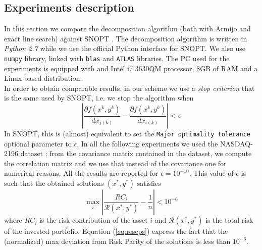 
\subsection{Experiments description}
In this section we compare the decomposition algorithm (both with Armijo and exact line search) against SNOPT \cite{snopt}.
The decomposition algorithm is written in \textit{Python 2.7} while we use the official Python interface for SNOPT. We also use \texttt{numpy} library, linked with \texttt{blas} and \texttt{ATLAS} libraries. The PC used for the experiments is equipped with and Intel i7 3630QM processor, 8GB of RAM and a Linux based distribution.\\
In order to obtain comparable results, in our scheme we use a \textit{stop criterion} that is the same used by SNOPT, i.e. we stop the algorithm when
\begin{equation}
\left| \frac{\partial f(x^k,y^k)}{d{x_{j(k)}}} - \frac{\partial f(x^k,y^k)}{d{x_{i(k)}} }\right| < \epsilon
\end{equation}
In SNOPT, this is (almost) equivalent to set the \texttt{Major optimality tolerance} optional parameter to $\epsilon$. 
In all the following experiments we used the NASDAQ-2196 dataset \cite{nasdaq}; from the covariance matrix contained in the dataset, we compute the correlation matrix and we use that instead of the covariance one for numerical reasons.
All the results are reported for $\epsilon = 10^{-10}$. This value of $\epsilon$ is such that the obtained solutions $(x^*,y^*)$ satisfies
\begin{equation}\label{eq:reseps}
\max_i \left| \frac{RC_i}{\mathcal{R}(x^*,y^*)} - \frac{1}{n} \right| < 10^{-6}
\end{equation}
where $RC_i$ is the risk contribution of the asset $i$ and ${\mathcal{R}(x^*,y^*)}$ is the total risk of the invested portfolio. Equation (\ref{eq:reseps}) express the fact that the (normalized) max deviation from Risk Parity of the solutions is less than $10^{-6}$.

